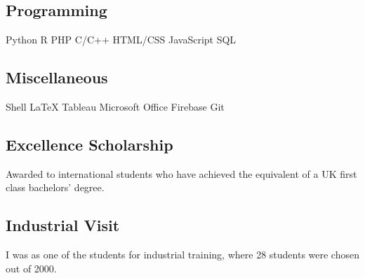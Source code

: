 \documentclass{article}
\begin{document}
\begin{minipage}[t]{0.33\textwidth}

\subsection{Programming}
Python \textbullet{}   R \textbullet{} PHP \textbullet{} C/C++ \textbullet{} HTML/CSS  \textbullet{}
JavaScript \textbullet{} SQL 
\sectionsep
\subsection{Miscellaneous}
Shell \textbullet{} \LaTeX \textbullet{} Tableau \textbullet{} Microsoft Office \textbullet{} Firebase \textbullet{} Git
\sectionsep


\subsection{Excellence Scholarship}
\vspace{\topsep} %
Awarded to international students who have achieved the equivalent of a UK first class bachelors' degree.
\sectionsep

\subsection{Industrial Visit}
\vspace{\topsep} %
I was as one of the students for industrial training, where 28 students were chosen out of 2000.
\sectionsep

\end{minipage} 
\hfill
\end{document}
